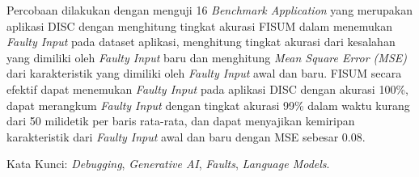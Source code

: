 Percobaan dilakukan dengan menguji 16 \textit{Benchmark Application} yang merupakan aplikasi DISC dengan menghitung tingkat akurasi FISUM dalam menemukan \textit{Faulty Input} pada dataset aplikasi, menghitung tingkat akurasi dari kesalahan yang dimiliki oleh \textit{Faulty Input} baru dan menghitung \textit{Mean Square Error (MSE)} dari karakteristik yang dimiliki oleh \textit{Faulty Input} awal dan baru. FISUM secara efektif dapat menemukan \textit{Faulty Input} pada aplikasi DISC dengan akurasi 100\%, dapat merangkum \textit{Faulty Input} dengan tingkat akurasi 99\% dalam waktu kurang dari 50 milidetik per baris rata-rata, dan dapat menyajikan kemiripan karakteristik dari \textit{Faulty Input} awal dan baru dengan MSE sebesar 0.08.


Kata Kunci: \emph{Debugging}, \emph{Generative AI}, \emph{Faults}, \emph{Language Models}.
